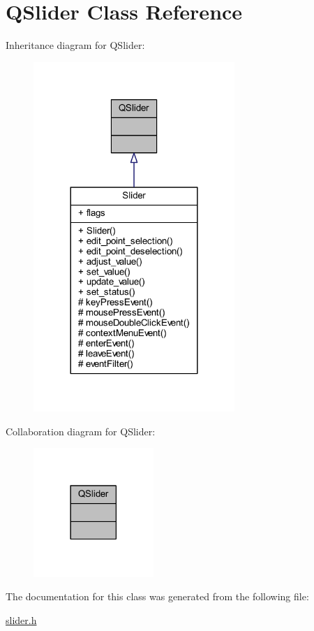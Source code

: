 \hypertarget{a00063}{\section{Q\+Slider Class Reference}
\label{a00063}
}


Inheritance diagram for Q\+Slider\+:
\nopagebreak
\begin{figure}[H]
\begin{center}
\leavevmode
\includegraphics[width=216pt]{d9/d8b/a00547}
\end{center}
\end{figure}


Collaboration diagram for Q\+Slider\+:
\nopagebreak
\begin{figure}[H]
\begin{center}
\leavevmode
\includegraphics[width=129pt]{dd/de6/a00548}
\end{center}
\end{figure}


The documentation for this class was generated from the following file\+:\begin{DoxyCompactItemize}
\item 
\hyperlink{a00078}{slider.\+h}\end{DoxyCompactItemize}
